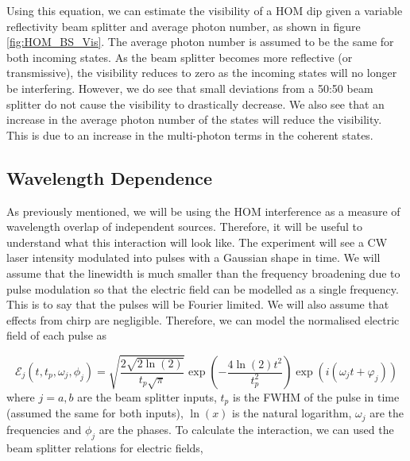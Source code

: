 Using this equation, we can estimate the visibility of a \ac{HOM} dip given a variable reflectivity beam splitter and average photon number, as shown in figure \ref{fig:HOM_BS_Vis}. The average photon number is assumed to be the same for both incoming states. As the beam splitter becomes more reflective (or transmissive), the visibility reduces to zero as the incoming states will no longer be interfering. However, we do see that small deviations from a {50:50} beam splitter do not cause the visibility to drastically decrease. We also see that an increase in the average photon number of the states will reduce the visibility. This is due to an increase in the multi-photon terms in the coherent states.


\subsection{Wavelength Dependence}

As previously mentioned, we will be using the \ac{HOM} interference as a measure of wavelength overlap of independent sources. Therefore, it will be useful to understand what this interaction will look like. The experiment will see a \ac{CW} laser intensity modulated into pulses with a Gaussian shape in time. We will assume that the linewidth is much smaller than the frequency broadening due to pulse modulation so that the electric field can be modelled as a single frequency. This is to say that the pulses will be Fourier limited. We will also assume that effects from chirp are negligible. Therefore, we can model the normalised electric field of each pulse as

\begin{equation}
	\mathcal{E}_j(t, t_p, \omega_j, \phi_j) = \sqrt{\frac{2 \sqrt{2\ln(2)}}{t_p\sqrt{\pi}}} \exp{\left(-\frac{4 \ln(2) t^2}{t_p^2}\right)} \exp{\left(i(\omega_j t + \varphi_j)\right)}
\end{equation}
where $j = a,b$ are the beam splitter inputs, $t_p$ is the \ac{FWHM} of the pulse in time (assumed the same for both inputs), $\ln(x)$ is the natural logarithm, $\omega_j$ are the frequencies and $\phi_j$ are the phases. To calculate the interaction, we can used the beam splitter relations for electric fields,

